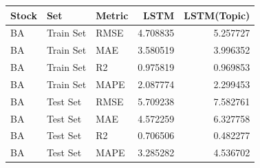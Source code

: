 \begin{tabular}{lllrr}
\toprule
Stock & Set & Metric & LSTM & LSTM(Topic) \\
\midrule
BA & Train Set & RMSE & 4.708835 & 5.257727 \\
BA & Train Set & MAE & 3.580519 & 3.996352 \\
BA & Train Set & R2 & 0.975819 & 0.969853 \\
BA & Train Set & MAPE & 2.087774 & 2.299453 \\
BA & Test Set & RMSE & 5.709238 & 7.582761 \\
BA & Test Set & MAE & 4.572259 & 6.327758 \\
BA & Test Set & R2 & 0.706506 & 0.482277 \\
BA & Test Set & MAPE & 3.285282 & 4.536702 \\
\bottomrule
\end{tabular}
